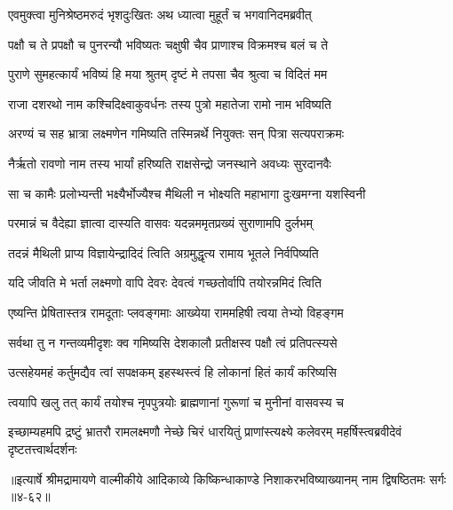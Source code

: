 
\twolineshloka
{एवमुक्त्वा मुनिश्रेष्ठमरुदं भृशदुःखितः}
{अथ ध्यात्वा मुहूर्तं च भगवानिदमब्रवीत्} %

\twolineshloka
{पक्षौ च ते प्रपक्षौ च पुनरन्यौ भविष्यतः}
{चक्षुषी चैव प्राणाश्च विक्रमश्च बलं च ते} %

\twolineshloka
{पुराणे सुमहत्कार्यं भविष्यं हि मया श्रुतम्}
{दृष्टं मे तपसा चैव श्रुत्वा च विदितं मम} %

\twolineshloka
{राजा दशरथो नाम कश्चिदिक्ष्वाकुवर्धनः}
{तस्य पुत्रो महातेजा रामो नाम भविष्यति} %

\twolineshloka
{अरण्यं च सह भ्रात्रा लक्ष्मणेन गमिष्यति}
{तस्मिन्नर्थे नियुक्तः सन् पित्रा सत्यपराक्रमः} %

\twolineshloka
{नैर्ऋतो रावणो नाम तस्य भार्यां हरिष्यति}
{राक्षसेन्द्रो जनस्थाने अवध्यः सुरदानवैः} %

\twolineshloka
{सा च कामैः प्रलोभ्यन्ती भक्ष्यैर्भोज्यैश्च मैथिली}
{न भोक्ष्यति महाभागा दुःखमग्ना यशस्विनी} %

\twolineshloka
{परमान्नं च वैदेह्या ज्ञात्वा दास्यति वासवः}
{यदन्नममृतप्रख्यं सुराणामपि दुर्लभम्} %

\twolineshloka
{तदन्नं मैथिली प्राप्य विज्ञायेन्द्रादिदं त्विति}
{अग्रमुद्धृत्य रामाय भूतले निर्वपिष्यति} %

\twolineshloka
{यदि जीवति मे भर्ता लक्ष्मणो वापि देवरः}
{देवत्वं गच्छतोर्वापि तयोरन्नमिदं त्विति} %

\twolineshloka
{एष्यन्ति प्रेषितास्तत्र रामदूताः प्लवङ्गमाः}
{आख्येया राममहिषी त्वया तेभ्यो विहङ्गम} %

\twolineshloka
{सर्वथा तु न गन्तव्यमीदृशः क्व गमिष्यसि}
{देशकालौ प्रतीक्षस्व पक्षौ त्वं प्रतिपत्स्यसे} %

\twolineshloka
{उत्सहेयमहं कर्तुमद्यैव त्वां सपक्षकम्}
{इहस्थस्त्वं हि लोकानां हितं कार्यं करिष्यसि} %

\twolineshloka
{त्वयापि खलु तत् कार्यं तयोश्च नृपपुत्रयोः}
{ब्राह्मणानां गुरूणां च मुनीनां वासवस्य च} %

\threelineshloka
{इच्छाम्यहमपि द्रष्टुं भ्रातरौ रामलक्ष्मणौ}
{नेच्छे चिरं धारयितुं प्राणांस्त्यक्ष्ये कलेवरम्}
{महर्षिस्त्वब्रवीदेवं दृष्टतत्त्वार्थदर्शनः} %


॥इत्यार्षे श्रीमद्रामायणे वाल्मीकीये आदिकाव्ये किष्किन्धाकाण्डे निशाकरभविष्याख्यानम् नाम द्विषष्ठितमः सर्गः ॥४-६२॥
